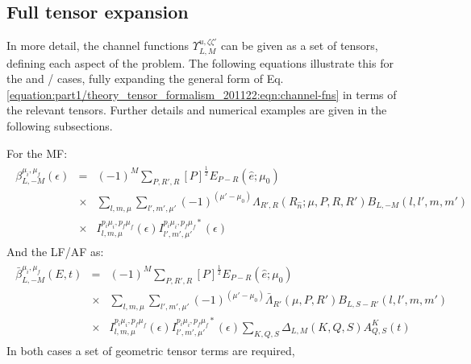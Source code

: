\documentclass[letterpaper,table,10pt,english]{jupyterBook}
\begin{document}
\subsection{Full tensor expansion}
\label{\detokenize{part1/theory_tensor_formalism_201122:full-tensor-expansion}}\label{\detokenize{part1/theory_tensor_formalism_201122:sec-full-tensor-expansion}}
\sphinxAtStartPar
In more detail, the channel functions \(\varUpsilon_{L,M}^{u,\zeta\zeta'}\) can be given as a set of tensors, defining each aspect of the problem. The following equations illustrate this for the {\hyperref[\detokenize{backmatter/glossary:term-MF}]{}} and {\hyperref[\detokenize{backmatter/glossary:term-LF}]{}}/{\hyperref[\detokenize{backmatter/glossary:term-AF}]{}} cases, fully expanding the general form of Eq. \eqref{equation:part1/theory_tensor_formalism_201122:eqn:channel-fns} in terms of the relevant tensors. Further details and numerical examples are given in the following sub\sphinxhyphen{}sections.

\sphinxAtStartPar
For the MF:
\begin{equation}\label{equation:part1/theory_tensor_formalism_201122:eq:BLM-tensor-MF}
\begin{split}\begin{aligned}
\beta_{L,-M}^{\mu_{i},\mu_{f}}(\epsilon) & = & (-1)^{M}\sum_{P,R',R}{[P]^{\frac{1}{2}}}{E_{P-R}(\hat{e};\mu_{0})}\\
 & \times &\sum_{l,m,\mu}\sum_{l',m',\mu'}(-1)^{(\mu'-\mu_{0})}{\Lambda_{R',R}(R_{\hat{n}};\mu,P,R,R')B_{L,-M}(l,l',m,m')}\\
 & \times & I_{l,m,\mu}^{p_{i}\mu_{i},p_{f}\mu_{f}}(\epsilon)I_{l',m',\mu'}^{p_{i}\mu_{i},p_{f}\mu_{f}*}(\epsilon)\end{aligned}\end{split}
\end{equation}
\sphinxAtStartPar
And the LF/AF as:
\begin{equation}\label{equation:part1/theory_tensor_formalism_201122:eq:BLM-tensor-AF}
\begin{split}\begin{aligned}
\bar{\beta}_{L,-M}^{\mu_{i},\mu_{f}}(E,t) & = & (-1)^{M}\sum_{P,R',R}{[P]^{\frac{1}{2}}}{E_{P-R}(\hat{e};\mu_{0})}\\
 & \times &\sum_{l,m,\mu}\sum_{l',m',\mu'}(-1)^{(\mu'-\mu_{0})}{\bar{\Lambda}_{R'}(\mu,P,R')B_{L,S-R'}(l,l',m,m')}\\
 & \times &I_{l,m,\mu}^{p_{i}\mu_{i},p_{f}\mu_{f}}(\epsilon)I_{l',m',\mu'}^{p_{i}\mu_{i},p_{f}\mu_{f}*}(\epsilon)\sum_{K,Q,S}\Delta_{L,M}(K,Q,S)A_{Q,S}^{K}(t)\end{aligned}\end{split}
\end{equation}
\sphinxAtStartPar
In both cases a set of geometric tensor terms are required,
\end{document}
